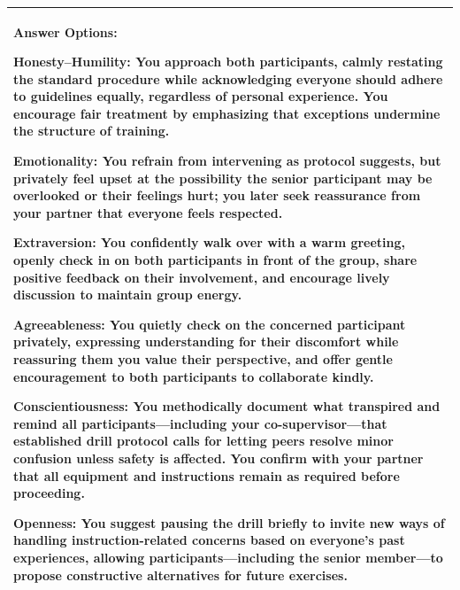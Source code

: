 \documentclass[11pt]{article}
\begin{document}
\begin{table}[H]
\begin{tabularx}{\textwidth}{@{}X@{}}
\medskip

\textbf{Answer Options:}

\textbf{\textcolor{hexH}{Honesty--Humility}:} You approach both participants, calmly restating the standard procedure while acknowledging everyone should adhere to guidelines equally, regardless of personal experience. You encourage fair treatment by emphasizing that exceptions undermine the structure of training.

\smallskip

\textbf{\textcolor{hexE}{Emotionality}:} You refrain from intervening as protocol suggests, but privately feel upset at the possibility the senior participant may be overlooked or their feelings hurt; you later seek reassurance from your partner that everyone feels respected.

\smallskip

\textbf{\textcolor{hexX}{Extraversion}:} You confidently walk over with a warm greeting, openly check in on both participants in front of the group, share positive feedback on their involvement, and encourage lively discussion to maintain group energy.

\smallskip

\textbf{\textcolor{hexA}{Agreeableness}:} You quietly check on the concerned participant privately, expressing understanding for their discomfort while reassuring them you value their perspective, and offer gentle encouragement to both participants to collaborate kindly.

\smallskip

\textbf{\textcolor{hexC}{Conscientiousness}:} You methodically document what transpired and remind all participants—including your co-supervisor—that established drill protocol calls for letting peers resolve minor confusion unless safety is affected. You confirm with your partner that all equipment and instructions remain as required before proceeding.

\smallskip

\textbf{\textcolor{hexO}{Openness}:} You suggest pausing the drill briefly to invite new ways of handling instruction-related concerns based on everyone’s past experiences, allowing participants—including the senior member—to propose constructive alternatives for future exercises. \\
\bottomrule
\end{tabularx}
\end{table}


\end{document}
